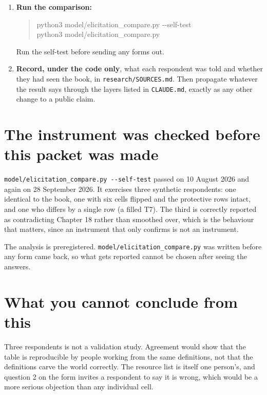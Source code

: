 \documentclass[11pt]{article}
\begin{document}
\begin{enumerate}[leftmargin=*,itemsep=6pt]
\item \textbf{Run the comparison:}

\begin{quote}\ttfamily\small
python3 model/elicitation\_compare.py -{}-self-test\\
python3 model/elicitation\_compare.py
\end{quote}

      Run the self-test before sending any forms out.

\item \textbf{Record, under the code only}, what each respondent was told and whether they had
      seen the book, in \texttt{research/SOURCES.md}. Then propagate whatever the result says through the
      layers listed in \texttt{CLAUDE.md}, exactly as any other change to a public claim.
\end{enumerate}

\section{The instrument was checked before this packet was made}

\texttt{model/elicitation\_compare.py -{}-self-test} passed on 10 August 2026 and again on 28
September 2026. It exercises three synthetic respondents: one identical to the book, one with six
cells flipped and the protective rows intact, and one who differs by a single row (a filled T7).
The third is correctly reported as contradicting Chapter 18 rather than smoothed over, which is
the behaviour that matters, since an instrument that only confirms is not an instrument.

The analysis is preregistered. \texttt{model/elicitation\_compare.py} was written before any form
came back, so what gets reported cannot be chosen after seeing the answers.

\section{What you cannot conclude from this}

Three respondents is not a validation study. Agreement would show that the table is reproducible
by people working from the same definitions, not that the definitions carve the world correctly.
The resource list is itself one person's, and question 2 on the form invites a respondent to say
it is wrong, which would be a more serious objection than any individual cell.
\end{document}
